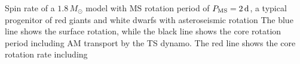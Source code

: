  \label{fig:MRI1.8rot} Spin rate of a $1.8 \, M_\odot$ model with MS rotation period of $P_{\rm MS} = 2 \, {\rm d}$, a typical progenitor of red giants and white dwarfs with asteroseismic rotation  The blue line shows the surface rotation, while the black line shows the core rotation period including AM transport by the TS dynamo. The red line shows the core rotation rate including